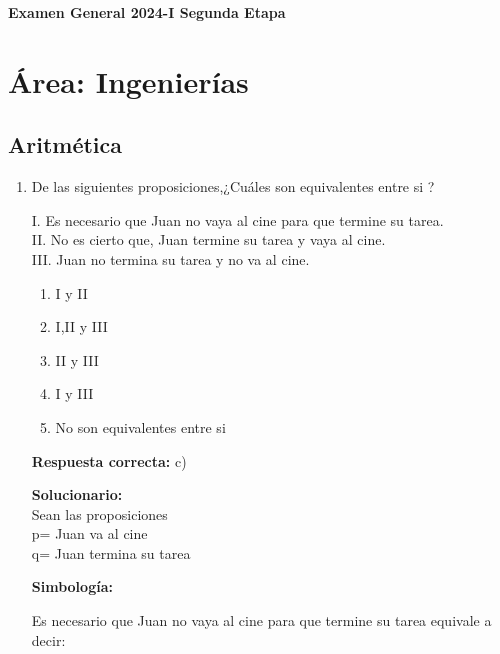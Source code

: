 
\clearpage
\thispagestyle{empty}

\vspace*{\fill}
\begin{center}
	{\Huge\bfseries Examen General 2024-I Segunda Etapa}
\end{center}
\vspace*{\fill}

\clearpage

\section*{Área: Ingenierías}


\subsection*{Aritmética}
\begin{enumerate}
	
	\item De las siguientes proposiciones,¿Cuáles son equivalentes entre si ?
	
	I. Es necesario que Juan no vaya al cine para que termine su tarea. \\
	II. No es cierto que, Juan termine su tarea y vaya al cine.\\ 
	III. Juan no termina su tarea y no va al cine.\\
	
	\begin{enumerate}[label=\alph*)]
		\item I y II
		\item I,II y III
		\item II y III
		\item I y III
		\item No son equivalentes entre si
	\end{enumerate}
	\textbf{Respuesta correcta:} c)
	
	\vspace{2mm}
	\textbf{Solucionario:}\\
	Sean las proposiciones\\
	p= Juan va al cine\\
	q= Juan termina su tarea\\
	
	\vspace{1mm}
	
	\textbf{Simbología:}
	
	\noindent \textbullet \quad Es necesario que Juan no vaya al cine para que termine su tarea equivale a decir: 
	\vspace{0.2cm}
	

\end{enumerate}
